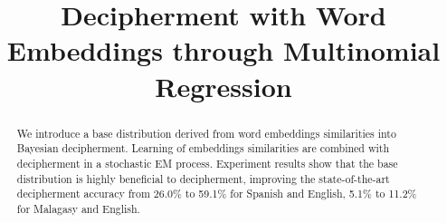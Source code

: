 \documentclass[11pt]{article}
\title{Decipherment with Word Embeddings through Multinomial Regression}
\date{}
\begin{document}
\maketitle
\begin{abstract}
We introduce a base distribution derived from word embeddings similarities into Bayesian decipherment. Learning of embeddings similarities are combined with decipherment in a stochastic EM process. Experiment results show that the base distribution is highly beneficial to decipherment, improving the state-of-the-art decipherment accuracy from 26.0\% to 59.1\% for Spanish and English, 5.1\% to 11.2\% for Malagasy and English. 
\end{abstract}














\end{document}
